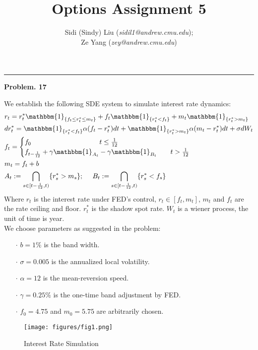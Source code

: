 \documentclass[10 pt]{hwtemplate} %
\title{\textbf{Options Assignment 5}}
\author{Sidi (Sindy) Liu (\textit{sidil1@andrew.cmu.edu}); \\ Ze Yang (\textit{zey@andrew.cmu.edu})}
\begin{document}
\maketitle


\noindent\rule{16cm}{0.4pt}
\textbf{Problem. 17} 
\begin{solution} We establish the following SDE system to simulate interest rate dynamics:
\begin{equation}
\begin{split}
	&r_t = r_t^* \mathbbm{1}_{\{f_t \leq r^*_{t}\leq m_t\}} + f_t \mathbbm{1}_{\{r^*_t < f_t\}} + m_t \mathbbm{1}_{\{r^*_t > m_t\}}\\
	&dr^*_t = \mathbbm{1}_{\{r^*_t < f_t\}} \alpha(f_t - r^*_t)dt + \mathbbm{1}_{\{r^*_t > m_t\}} \alpha(m_t - r^*_t)dt + \sigma dW_t\\
	&f_t = \begin{cases}
	f_0\qquad\qquad\qquad\qquad\quad~~~ t\leq \frac{1}{12}\\
	f_{t-\frac{1}{12}} + \gamma \mathbbm{1}_{A_t} - \gamma \mathbbm{1}_{B_t} \qquad t > \frac{1}{12}
	\end{cases}\\
	&m_t = f_t + b\\
	&A_t:= \bigcap_{s \in [t-\frac{1}{12}, t)} \{r^*_s > m_s\};~~~~B_t:= \bigcap_{s \in [t-\frac{1}{12}, t)} \{r^*_s < f_s\}
\end{split}	
\end{equation}
Where $r_t$ is the interest rate under FED's control, $r_t \in [f_t, m_t]$, $m_t$ and $f_t$ are the rate ceiling and floor. $r^*_t$ is the shadow spot rate. $W_t$ is a wiener process, the unit of time is year.\\
We choose parameters as suggested in the problem:
\begin{itemize}
	\item[$\cdot$] $b = 1\%$ is the band width.
	\item[$\cdot$] $\sigma = 0.005$ is the annualized local volatility.
	\item[$\cdot$] $\alpha = 12$ is the mean-reversion speed.
	\item[$\cdot$] $\gamma = 0.25\%$ is the one-time band adjustment by FED.
	\item[$\cdot$] $f_0 = 4.75$ and $m_0 = 5.75$ are arbitrarily chosen. 
\end{itemize}

\begin{figure}[H]
  \centering
  \captionsetup{justification=centering}
  \caption{Interest Rate Simulation}
  \texttt{[image: figures/fig1.png]}
\end{figure}
\end{solution}
\end{document}

